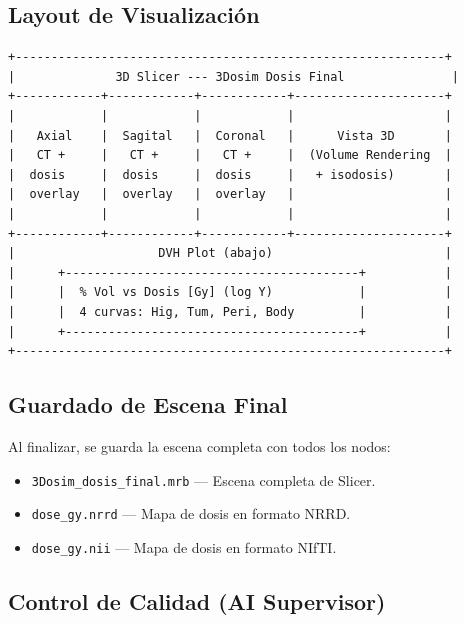 \documentclass[12pt,a4paper]{article}
\begin{document}
\subsection{Layout de Visualización}

\begin{verbatim}
+------------------------------------------------------------+
|              3D Slicer --- 3Dosim Dosis Final               |
+------------+------------+------------+---------------------+
|            |            |            |                     |
|   Axial    |  Sagital   |  Coronal   |      Vista 3D       |
|   CT +     |   CT +     |   CT +     |  (Volume Rendering  |
|  dosis     |  dosis     |  dosis     |   + isodosis)       |
|  overlay   |  overlay   |  overlay   |                     |
|            |            |            |                     |
+------------+------------+------------+---------------------+
|                    DVH Plot (abajo)                        |
|      +-----------------------------------------+           |
|      |  % Vol vs Dosis [Gy] (log Y)            |           |
|      |  4 curvas: Hig, Tum, Peri, Body         |           |
|      +-----------------------------------------+           |
+------------------------------------------------------------+
\end{verbatim}

\subsection{Guardado de Escena Final}

Al finalizar, se guarda la escena completa con todos los nodos:

\begin{itemize}
  \item \texttt{3Dosim\_dosis\_final.mrb} --- Escena completa de Slicer.
  \item \texttt{dose\_gy.nrrd} --- Mapa de dosis en formato NRRD.
  \item \texttt{dose\_gy.nii} --- Mapa de dosis en formato NIfTI.
\end{itemize}

\subsection*{Control de Calidad (AI Supervisor)}
\end{document}
